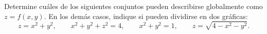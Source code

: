 Determine cuáles de los siguientes conjuntos pueden describirse globalmente como $z=f(x,y)$. En los demás casos, indique si pueden dividirse en dos gráficas:
\[
z=x^2+y^2,\qquad x^2+y^2+z^2=4,
\qquad x^2+y^2=1,
\qquad z=\sqrt{4-x^2-y^2}.
\]
